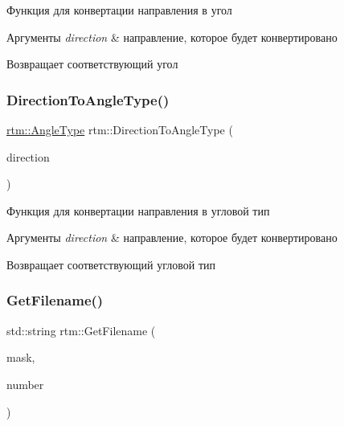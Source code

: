 Функция для конвертации направления в угол 


\begin{DoxyParams}{Аргументы}
{\em direction} & направление, которое будет конвертировано \\
\hline
\end{DoxyParams}
\begin{DoxyReturn}{Возвращает}
соответствующий угол 
\end{DoxyReturn}
\mbox{\label{namespacertm_aa37fca29e3577b3389a9e8eb40d20d14}} 
\subsubsection{\texorpdfstring{Direction\+To\+Angle\+Type()}{DirectionToAngleType()}}
{\footnotesize\ttfamily \hyperlink{namespacertm_a69dc82b16a0148c10962caa83d930f89}{rtm\+::\+Angle\+Type} rtm\+::\+Direction\+To\+Angle\+Type (\begin{DoxyParamCaption}\item[{\hyperlink{namespacertm_a57b216f3aeb45041f3461bab08bc3aeb}{Direction\+Type}}]{direction }\end{DoxyParamCaption})}



Функция для конвертации направления в угловой тип 


\begin{DoxyParams}{Аргументы}
{\em direction} & направление, которое будет конвертировано \\
\hline
\end{DoxyParams}
\begin{DoxyReturn}{Возвращает}
соответствующий угловой тип 
\end{DoxyReturn}
\mbox{\label{namespacertm_a67bf20fe33d85bc05547ff1849aeb29e}} 
\subsubsection{\texorpdfstring{Get\+Filename()}{GetFilename()}}
{\footnotesize\ttfamily std\+::string rtm\+::\+Get\+Filename (\begin{DoxyParamCaption}\item[{std\+::string const \&}]{mask,  }\item[{size\+\_\+t}]{number }\end{DoxyParamCaption})}



